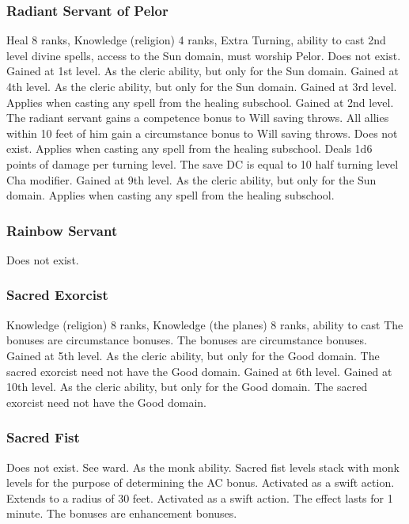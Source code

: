 \subsubsection{Radiant Servant of Pelor}
 Heal 8 ranks, Knowledge (religion) 4 ranks, Extra Turning, ability to cast 2nd level divine spells, access to the Sun domain, must worship Pelor.
 Does not exist.
 Gained at 1st level. As the cleric ability, but only for the Sun domain.
 Gained at 4th level. As the cleric ability, but only for the Sun domain.
 Gained at 3rd level. Applies when casting any spell from the healing subschool.
 Gained at 2nd level. The radiant servant gains a  competence bonus to Will saving throws. All allies within 10 feet of him gain a  circumstance bonus to Will saving throws.
 Does not exist.
 Applies when casting any spell from the healing subschool.
 Deals 1d6 points of damage per turning level. The save DC is equal to 10 \add half turning level \add Cha modifier.
 Gained at 9th level. As the cleric ability, but only for the Sun domain.
 Applies when casting any spell from the healing subschool.
\subsubsection{Rainbow Servant}
Does not exist.
\subsubsection{Sacred Exorcist}
 Knowledge (religion) 8 ranks, Knowledge (the planes) 8 ranks, ability to cast 
 The bonuses are circumstance bonuses.
 The bonuses are circumstance bonuses.
 Gained at 5th level. As the cleric ability, but only for the Good domain. The sacred exorcist need not have the Good domain.
 Gained at 6th level.
 Gained at 10th level. As the cleric ability, but only for the Good domain. The sacred exorcist need not have the Good domain.
\subsubsection{Sacred Fist}
 Does not exist. See \ki ward.
 As the monk ability. Sacred fist levels stack with monk levels for the purpose of determining the AC bonus.
 Activated as a swift action.
 Extends to a radius of 30 feet.
 Activated as a swift action. The effect lasts for 1 minute. The bonuses are enhancement bonuses.
